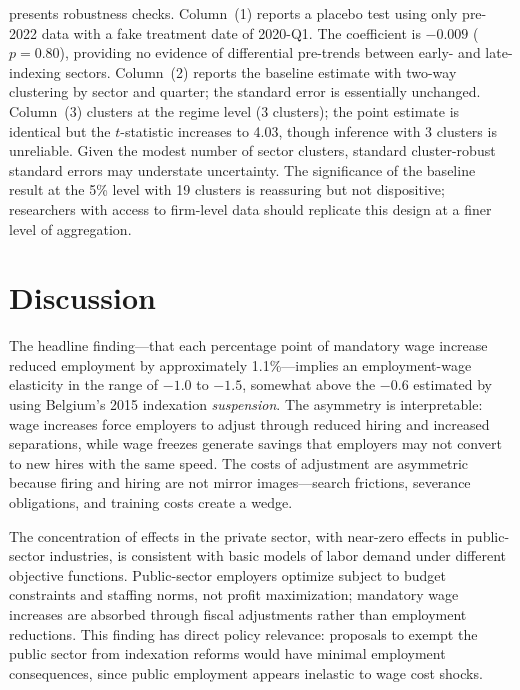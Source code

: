 \documentclass[12pt]{article}
\begin{document}
 presents robustness checks. Column~(1) reports a placebo test using only pre-2022 data with a fake treatment date of 2020-Q1. The coefficient is $-0.009$ ($p = 0.80$), providing no evidence of differential pre-trends between early- and late-indexing sectors. Column~(2) reports the baseline estimate with two-way clustering by sector and quarter; the standard error is essentially unchanged. Column~(3) clusters at the regime level (3 clusters); the point estimate is identical but the $t$-statistic increases to 4.03, though inference with 3 clusters is unreliable. Given the modest number of sector clusters, standard cluster-robust standard errors may understate uncertainty. The significance of the baseline result at the 5\% level with 19 clusters is reassuring but not dispositive; researchers with access to firm-level data should replicate this design at a finer level of aggregation.




\section{Discussion}

The headline finding---that each percentage point of mandatory wage increase reduced employment by approximately 1.1\%---implies an employment-wage elasticity in the range of $-1.0$ to $-1.5$, somewhat above the $-0.6$ estimated by \citet{vandekerckhove2023} using Belgium's 2015 indexation \textit{suspension}. The asymmetry is interpretable: wage increases force employers to adjust through reduced hiring and increased separations, while wage freezes generate savings that employers may not convert to new hires with the same speed. The costs of adjustment are asymmetric because firing and hiring are not mirror images---search frictions, severance obligations, and training costs create a wedge.

The concentration of effects in the private sector, with near-zero effects in public-sector industries, is consistent with basic models of labor demand under different objective functions. Public-sector employers optimize subject to budget constraints and staffing norms, not profit maximization; mandatory wage increases are absorbed through fiscal adjustments rather than employment reductions. This finding has direct policy relevance: proposals to exempt the public sector from indexation reforms would have minimal employment consequences, since public employment appears inelastic to wage cost shocks.
\end{document}
